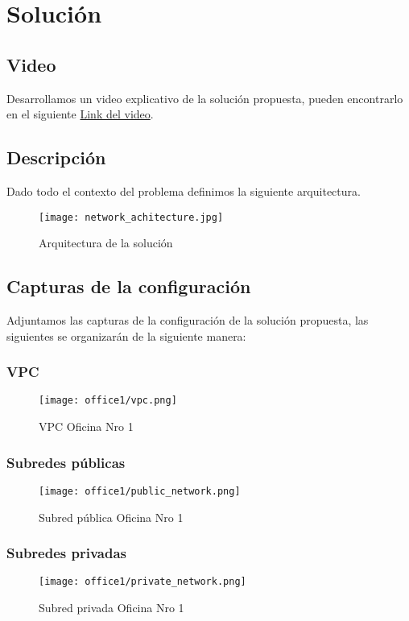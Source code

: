 \section{Solución}

\subsection{Video}
Desarrollamos un video explicativo de la solución propuesta, pueden encontrarlo
en el siguiente \href{https://www.overleaf.com/learn/latex/Inserting_Images}{Link del video}.

\subsection{Descripción}
Dado todo el contexto del problema definimos la siguiente arquitectura.

\begin{figure}[h]
    \centering
    \texttt{[image: network\_achitecture.jpg]}
    \caption{Arquitectura de la solución}
\end{figure}

\subsection{Capturas de la configuración}
Adjuntamos las capturas de la configuración de la solución propuesta,
las siguientes se organizarán de la siguiente manera:

\subsubsection{VPC}
\begin{figure}[!h]
    \centering
    \texttt{[image: office1/vpc.png]}
    \caption{VPC Oficina Nro 1}
\end{figure}


\subsubsection{Subredes públicas}
\begin{figure}[h!]
    \centering
    \texttt{[image: office1/public\_network.png]}
    \caption{Subred pública Oficina Nro 1}
\end{figure}


\subsubsection{Subredes privadas}
\begin{figure}[h!]
    \centering
    \texttt{[image: office1/private\_network.png]}
    \caption{Subred privada Oficina Nro 1}
\end{figure}


